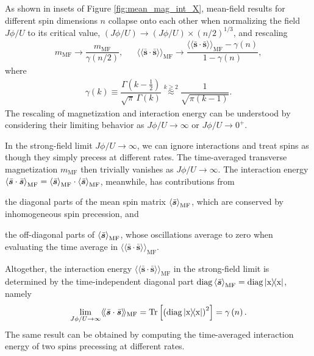 \documentclass[nofootinbib,twocolumn]{revtex4-2}
\newcommand{\f}[2]{\dfrac{#1}{#2}} %
\newcommand{\p}[1]{\left(#1\right)} %
\renewcommand{\sp}[1]{\left[#1\right]} %
\newcommand{\bk}{\Braket} %
\renewcommand{\v}{\bm} %
\renewcommand{\c}{\cdot} %
\newcommand{\bbk}[1]{\langle\!\langle #1 \rangle\!\rangle}
\newcommand{\1}{\mathds{1}}
\newcommand{\x}{\text{x}}
\newcommand{\MF}{\text{MF}}
\renewcommand{\ss}{\bar{\v s}\c\bar{\v s}}
\DeclareMathOperator{\diag}{diag}
\begin{document}
As shown in insets of Figure \ref{fig:mean_mag_int_X}, mean-field results for different spin dimensions $n$ collapse onto each other when normalizing the field $J\phi/U$ to its critical value, $\p{J\phi/U}\to\p{J\phi/U}\times\p{n/2}^{1/3}$, and rescaling
\begin{align}
  m_\MF \to \f{m_\MF}{\gamma\p{n/2}},
  &&
  \bbk{\ss}_\MF \to \f{\bbk{\ss}_\MF-\gamma\p{n}}{1-\gamma\p{n}},
  \label{eq:rescale}
\end{align}
where
\begin{align}
  \gamma\p{k} \equiv \f{\Gamma\p{k-\frac12}}{\sqrt\pi\,\Gamma\p{k}}
  \stackrel{k\ge2}{\approx} \f1{\sqrt{\pi(k-1)}}.
  \label{eq:gamma}
\end{align}
The rescaling of magnetization and interaction energy can be understood by considering their limiting behavior as $J\phi/U\to\infty$ or $J\phi/U\to0^+$.

In the strong-field limit $J\phi/U\to\infty$, we can ignore interactions and treat spins as though they simply precess at different rates.
The time-averaged transverse magnetization $m_\MF$ then trivially vanishes as $J\phi/U\to\infty$.
The interaction energy $\bk{\ss}_\MF = \bk{\bar{\v s}}_\MF \c \bk{\bar{\v s}}_\MF$, meanwhile, has contributions from
\begin{enumerate*}
\item the diagonal parts of the mean spin matrix $\bk{\bar{\v s}}_\MF$, which are conserved by inhomogeneous spin precession, and
\item the off-diagonal parts of $\bk{\bar{\v s}}_\MF$, whose oscillations average to zero when evaluating the time average in $\bbk{\ss}_\MF$.
\end{enumerate*}
Altogether, the interaction energy $\bbk{\ss}_\MF$ in the strong-field limit is determined by the time-independent diagonal part $\diag\bk{\bar{\v s}}_\MF = \diag\op{\x}$, namely
\begin{align}
  \lim_{J\phi/U\to\infty} \bbk{\ss}_\MF
  = \Tr\sp{\p{\diag\op{\x}}^2}
  = \gamma\p{n}.
  \label{eq:lim_ss}
\end{align}
The same result can be obtained by computing the time-averaged interaction energy of two spins precessing at different rates.
\end{document}
